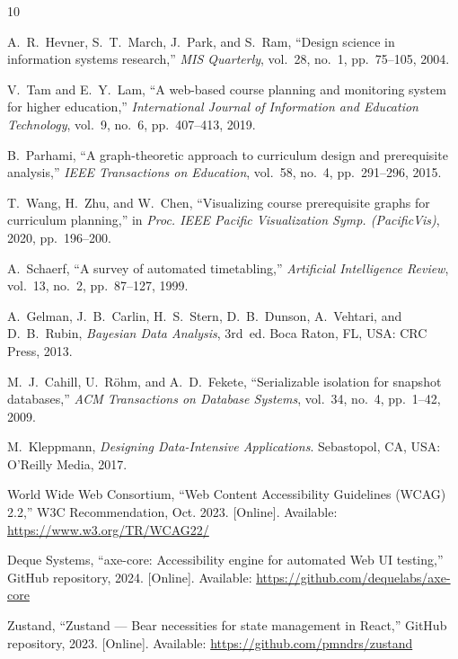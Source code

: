 \documentclass{iu-thesis}
\begin{document}
\begin{thebibliography}{10}

 A.~R.~Hevner, S.~T.~March, J.~Park, and S.~Ram, ``Design science in information systems research,'' \textit{MIS Quarterly}, vol.~28, no.~1, pp.~75--105, 2004.

 V.~Tam and E.~Y.~Lam, ``A web-based course planning and monitoring system for higher education,'' \textit{International Journal of Information and Education Technology}, vol.~9, no.~6, pp.~407--413, 2019.

 B.~Parhami, ``A graph-theoretic approach to curriculum design and prerequisite analysis,'' \textit{IEEE Transactions on Education}, vol.~58, no.~4, pp.~291--296, 2015.

 T.~Wang, H.~Zhu, and W.~Chen, ``Visualizing course prerequisite graphs for curriculum planning,'' in \textit{Proc. IEEE Pacific Visualization Symp. (PacificVis)}, 2020, pp.~196--200.

 A.~Schaerf, ``A survey of automated timetabling,'' \textit{Artificial Intelligence Review}, vol.~13, no.~2, pp.~87--127, 1999.

 A.~Gelman, J.~B.~Carlin, H.~S.~Stern, D.~B.~Dunson, A.~Vehtari, and D.~B.~Rubin, \textit{Bayesian Data Analysis}, 3rd~ed. Boca Raton, FL, USA: CRC Press, 2013.

 M.~J.~Cahill, U.~R\"ohm, and A.~D.~Fekete, ``Serializable isolation for snapshot databases,'' \textit{ACM Transactions on Database Systems}, vol.~34, no.~4, pp.~1--42, 2009.

 M.~Kleppmann, \textit{Designing Data-Intensive Applications}. Sebastopol, CA, USA: O'Reilly Media, 2017.

 World Wide Web Consortium, ``Web Content Accessibility Guidelines (WCAG) 2.2,'' W3C Recommendation, Oct. 2023. [Online]. Available: \url{https://www.w3.org/TR/WCAG22/}

 Deque Systems, ``axe-core: Accessibility engine for automated Web UI testing,'' GitHub repository, 2024. [Online]. Available: \url{https://github.com/dequelabs/axe-core}

 Zustand, ``Zustand --- Bear necessities for state management in React,'' GitHub repository, 2023. [Online]. Available: \url{https://github.com/pmndrs/zustand}


\end{thebibliography}
\end{document}
